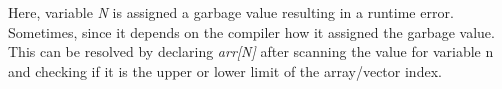 \documentclass{book}
\begin{document}
Here, variable \textit{N} is assigned a garbage value resulting in a runtime error. Sometimes, since it depends on the compiler how it assigned the garbage value. This can be resolved by declaring \textit{arr[N]} after scanning the value for variable n and checking if it is the upper or lower limit of the array/vector index.
\end{document}

